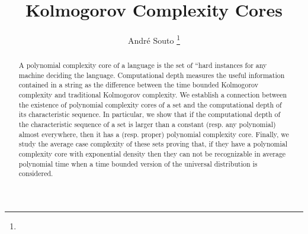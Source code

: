 \documentclass[11pt]{llncs}
\title{Kolmogorov Complexity Cores}
\author{
Andr\'{e} Souto \thanks{\email{andresouto@dcc.fc.up.pt}}\\
}
\institute{Universidade Porto
\\
Instituto de Telecomunica\c{c}\~{o}es
}
\begin{document}
\maketitle

\begin{abstract}
A polynomial complexity core of a language is the set of ``hard
instances for any machine deciding the language. Computational depth
measures the useful information contained in a string as the
difference between the time bounded Kolmogorov complexity and
traditional Kolmogorov complexity. We establish a connection between
the existence of polynomial complexity cores of a set and the
computational depth of its characteristic sequence. In particular, we
show that if the computational depth of the characteristic sequence of
a set is larger than a constant (resp. any polynomial) almost
everywhere, then it has a (resp. proper) polynomial complexity
core. Finally, we study the average case complexity of
these sets proving that, if they have a polynomial complexity core with
exponential
density then they can not be recognizable in average polynomial time
when a time bounded
version of the universal distribution is considered.

\end{abstract} 
 
 
 
\end{document}
